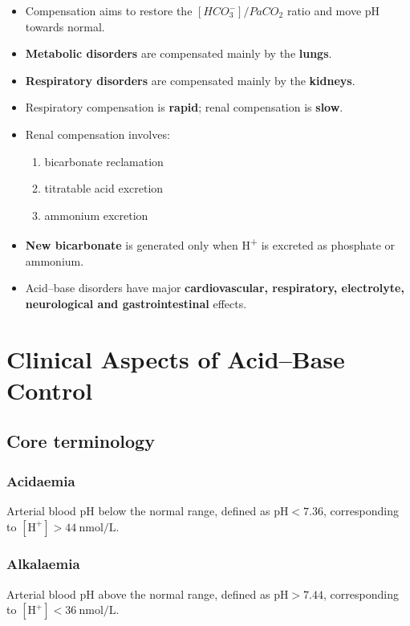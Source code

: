\documentclass[11pt,a4paper]{article}
\begin{document}
\begin{itemize}
  \item Compensation aims to restore the \([HCO_3^-]/PaCO_2\) ratio and move pH towards normal.
  \item \textbf{Metabolic disorders} are compensated mainly by the \textbf{lungs}.
  \item \textbf{Respiratory disorders} are compensated mainly by the \textbf{kidneys}.
  \item Respiratory compensation is \textbf{rapid}; renal compensation is \textbf{slow}.
  \item Renal compensation involves:
  \begin{enumerate}
    \item bicarbonate reclamation
    \item titratable acid excretion
    \item ammonium excretion
  \end{enumerate}
  \item \textbf{New bicarbonate} is generated only when H\textsuperscript{+} is excreted as phosphate or ammonium.
  \item Acid--base disorders have major \textbf{cardiovascular, respiratory, electrolyte, neurological and gastrointestinal} effects.
\end{itemize}

\section{Clinical Aspects of Acid--Base Control}

\subsection{Core terminology}

\subsubsection{Acidaemia}
Arterial blood pH below the normal range, defined as \(\mathrm{pH} < 7.36\), corresponding to \([\mathrm{H}^+] > 44~\mathrm{nmol/L}\).

\subsubsection{Alkalaemia}
Arterial blood pH above the normal range, defined as \(\mathrm{pH} > 7.44\), corresponding to \([\mathrm{H}^+] < 36~\mathrm{nmol/L}\).
\end{document}
